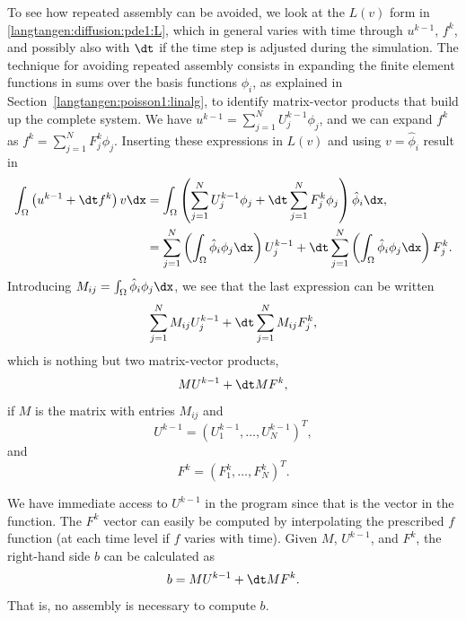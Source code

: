 To see how repeated assembly can be avoided, we look at the $L(v)$
form in \eqref{langtangen:diffusion:pde1:L}, which in general varies
with time through $u^{k-1}$, $f^k$, and possibly also with ${\dt}$
if the time step is adjusted during the simulation.  The technique
for avoiding repeated assembly consists in expanding the finite
element functions in sums over the basis functions $\phi_i$, as
explained in Section~\ref{langtangen:poisson1:linalg}, to identify
matrix-vector products that build up the complete system. We have
$u^{k-1}=\sum_{j=1}^NU^{k-1}_j\phi_j$, and we can expand $f^k$ as
$f^{k}=\sum_{j=1}^NF^{k}_j\phi_j$. Inserting these expressions in $L(v)$
and using $v=\hat\phi_i$ result in
\begin{equation}
\begin{split}
\int_\Omega \left(u^{k-1} + {\dt}f^k\right)v\dx
  &= \int_\Omega \left(\sum_{j=1}^N U^{k-1}_j\phi_j + {\dt}\sum_{j=1}^N F^{k}_j\phi_j\right)\hat\phi_i\dx,
\\
  &=\sum_{j=1}^N\left(\int_\Omega \hat\phi_i\phi_j\dx\right)U^{k-1}_j
 + {\dt}\sum_{j=1}^N\left(\int_\Omega \hat\phi_i\phi_j\dx\right)F^{k}_j.
\end{split}
\end{equation}
Introducing $M_{ij} = \int_\Omega \hat\phi_i\phi_j\dx$, we see that
the last expression can be written
\begin{equation}
  \sum_{j=1}^NM_{ij}U^{k-1}_j + {\dt} \sum_{j=1}^NM_{ij}F^{k}_j,
\end{equation}
which is nothing but two matrix-vector products,
\begin{equation}
   MU^{k-1} + {\dt} MF^k,
\end{equation}
if $M$ is the matrix with entries $M_{ij}$ and
\begin{equation}
  U^{k-1}=(U^{k-1}_1,\ldots,U^{k-1}_N)^T,
\end{equation}
and
\begin{equation}
 F^k=(F^{k}_1,\ldots,F^{k}_N)^T.
\end{equation}

We have immediate access to $U^{k-1}$
in the program since that is the vector
in the  function. The $F^k$ vector can easily be
computed by interpolating the prescribed $f$ function (at each time level if
$f$ varies with time). Given $M$, $U^{k-1}$, and $F^k$, the right-hand side
$b$ can be calculated as
\begin{equation}
 b = MU^{k-1} + {\dt} MF^k.
\end{equation}
That is, no assembly is necessary to compute $b$.

